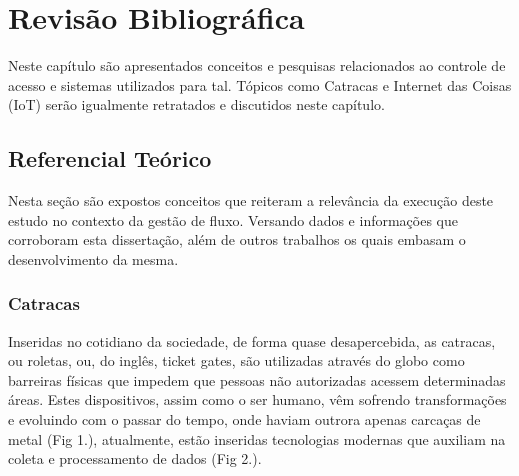 \chapter{Revisão Bibliográfica}
\label{cap:revisao_bibliografica}
Neste capítulo são apresentados conceitos e pesquisas relacionados ao controle de acesso e sistemas utilizados para tal. Tópicos como Catracas e Internet das Coisas (IoT) serão igualmente retratados e discutidos neste capítulo.
\section{Referencial Teórico}

Nesta seção são expostos conceitos que reiteram a relevância da execução deste estudo no contexto da gestão de fluxo. Versando dados e informações que corroboram esta dissertação, além de outros trabalhos os quais embasam o desenvolvimento da mesma.
\subsection{Catracas}

Inseridas no cotidiano da sociedade, de forma quase desapercebida, as catracas, ou roletas, ou, do inglês, ticket gates, são utilizadas através do globo como barreiras físicas que impedem que pessoas não autorizadas acessem determinadas áreas. Estes dispositivos, assim como o ser humano, vêm sofrendo transformações e evoluindo com o passar do tempo, onde haviam outrora apenas carcaças de metal (Fig 1.), atualmente, estão inseridas tecnologias modernas que auxiliam na coleta e processamento de dados (Fig 2.).

